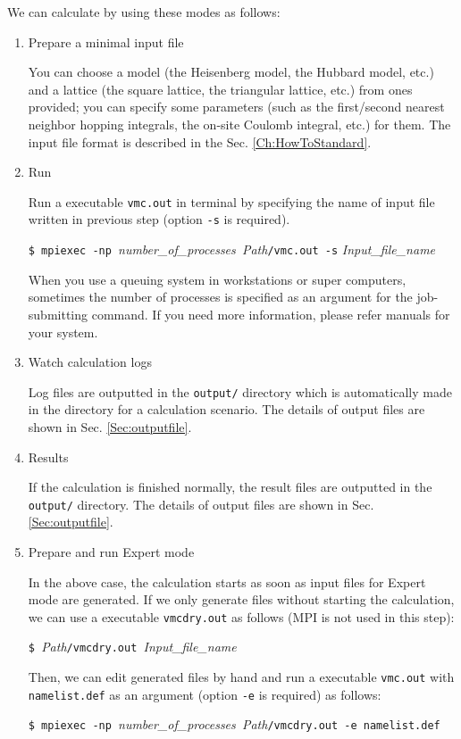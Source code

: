 We can calculate by using these modes as follows:

\begin{enumerate}

\item  Prepare a minimal input file

You can choose a model (the Heisenberg model, the Hubbard model, etc.) and 
a lattice (the square lattice, the triangular lattice, etc.) from ones provided;
you can specify some parameters (such as the first/second nearest neighbor hopping integrals,
the on-site Coulomb integral, etc.) for them.
The input file format is described in the Sec. \ref{Ch:HowToStandard}.

\item  Run

Run a executable \verb|vmc.out| in terminal by specifying
the name of input file written in previous step
(option \verb|-s| is required).

\verb|$ mpiexec -np |\textit{number\_of\_processes}\verb| |\textit{Path}\verb|/vmc.out -s| \textit{Input\_file\_name}

When you use a queuing system in workstations or super computers, 
sometimes the number of processes is specified as an argument for the job-submitting command.
If you need more information, please refer manuals for your system. 

\item Watch calculation logs

Log files are outputted in the \verb|output/| directory which is automatically made in the directory for a calculation scenario.
The details of output files are shown in Sec. \ref{Sec:outputfile}.

\item Results

  If the calculation is finished normally, the result files are outputted in the \verb|output/| directory.
  The details of output files are shown in Sec. \ref{Sec:outputfile}.

\item Prepare and run Expert mode

  In the above case, the calculation starts as soon as input files
  for Expert mode are generated.
  If we only generate files without starting the calculation,
  we can use a executable \verb|vmcdry.out| as follows
  (MPI is not used in this step):

  \verb|$ |\textit{Path}\verb|/vmcdry.out |\textit{Input\_file\_name}

  Then, we can edit generated files by hand and run a executable \verb|vmc.out| with 
  \verb|namelist.def| as an argument (option \verb|-e| is required) as follows:

  \verb|$ mpiexec -np |\textit{number\_of\_processes}\verb| |\textit{Path}\verb|/vmcdry.out -e namelist.def|

\end{enumerate}

